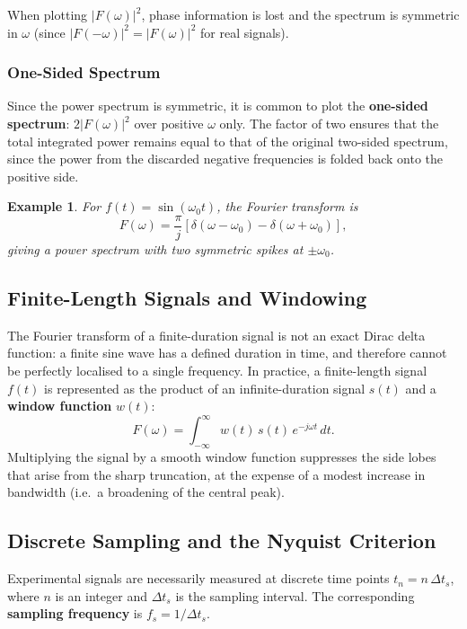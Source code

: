 \documentclass{article}
\newtheorem*{example}{Example}
\begin{document}
When plotting $|F(\omega)|^2$, phase information is lost and the spectrum is symmetric in $\omega$ (since $|F(-\omega)|^2 = |F(\omega)|^2$ for real signals).

\subsubsection{One-Sided Spectrum}
Since the power spectrum is symmetric, it is common to plot the \textbf{one-sided spectrum}: $2|F(\omega)|^2$ over positive $\omega$ only. The factor of two ensures that the total integrated power remains equal to that of the original two-sided spectrum, since the power from the discarded negative frequencies is folded back onto the positive side.

\begin{example}
    For $f(t) = \sin(\omega_0 t)$, the Fourier transform is
    \[F(\omega) = \frac{\pi}{j}\left[\delta(\omega - \omega_0) - \delta(\omega + \omega_0)\right],\]
    giving a power spectrum with two symmetric spikes at $\pm\omega_0$.
\end{example}

\subsection{Finite-Length Signals and Windowing}

The Fourier transform of a finite-duration signal is not an exact Dirac delta function: a finite sine wave has a defined duration in time, and therefore cannot be perfectly localised to a single frequency. In practice, a finite-length signal $f(t)$ is represented as the product of an infinite-duration signal $s(t)$ and a \textbf{window function} $w(t)$:
\[F(\omega) = \int_{-\infty}^{\infty} w(t)\,s(t)\,e^{-j\omega t}\,dt.\]
Multiplying the signal by a smooth window function suppresses the side lobes that arise from the sharp truncation, at the expense of a modest increase in bandwidth (i.e.\ a broadening of the central peak).

\subsection{Discrete Sampling and the Nyquist Criterion}

Experimental signals are necessarily measured at discrete time points $t_n = n\,\Delta t_s$, where $n$ is an integer and $\Delta t_s$ is the sampling interval. The corresponding \textbf{sampling frequency} is $f_s = 1/\Delta t_s$.
\end{document}
